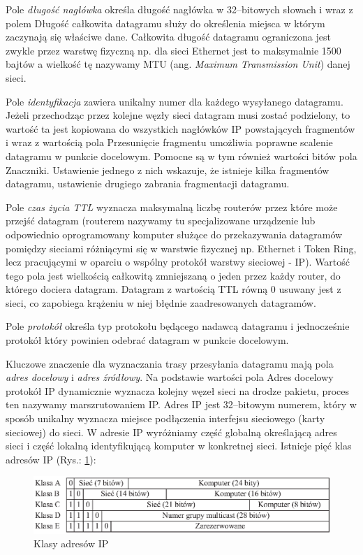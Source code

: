 Pole \emph{długość nagłówka} określa długość nagłówka w 32--bitowych słowach i wraz z polem Długość całkowita datagramu 
służy do określenia miejsca w którym zaczynają się właściwe dane. Całkowita długość datagramu ograniczona jest 
zwykle przez warstwę fizyczną np. dla sieci Ethernet jest to maksymalnie 1500 bajtów a wielkość tę nazywamy MTU 
(ang. \emph{Maximum Transmission Unit}) danej sieci.

Pole \emph{identyfikacja} zawiera unikalny numer dla każdego wysyłanego datagramu. Jeżeli przechodząc przez kolejne 
węzły sieci datagram musi zostać podzielony, to wartość ta jest kopiowana do wszystkich nagłówków IP 
powstających fragmentów i wraz z wartością pola Przesunięcie fragmentu umożliwia poprawne scalenie datagramu w 
punkcie docelowym. Pomocne są w tym również wartości bitów pola Znaczniki. Ustawienie jednego z nich wskazuje, 
że istnieje kilka fragmentów datagramu, ustawienie drugiego zabrania fragmentacji datagramu.

Pole \emph{czas życia TTL} wyznacza  maksymalną liczbę routerów przez które może przejść datagram (routerem 
nazywamy tu specjalizowane urządzenie lub odpowiednio oprogramowany komputer służące do przekazywania datagramów 
pomiędzy sieciami różniącymi się w warstwie fizycznej np. Ethernet i Token Ring, lecz pracującymi w oparciu o 
wspólny protokół warstwy sieciowej - IP). Wartość tego pola jest wielkością całkowitą zmniejszaną o jeden przez 
każdy router, do którego dociera datagram. Datagram z wartością TTL równą 0 usuwany jest z sieci, co zapobiega 
krążeniu w niej błędnie zaadresowanych datagramów.

Pole \emph{protokół} określa typ protokołu będącego nadawcą datagramu i jednocześnie protokół który powinien 
odebrać datagram w punkcie docelowym.

Kluczowe znaczenie dla wyznaczania trasy przesyłania datagramu mają pola \emph{adres docelowy} i \emph{adres źródłowy}. Na 
podstawie wartości pola Adres docelowy protokół IP dynamicznie wyznacza kolejny węzeł sieci na drodze pakietu, 
proces ten nazywamy marszrutowaniem IP. Adres IP jest 32--bitowym numerem, który w sposób unikalny wyznacza 
miejsce podłączenia interfejsu sieciowego (karty sieciowej) do sieci. W adresie IP wyróżniamy część globalną 
określającą adres sieci i część lokalną identyfikującą komputer w konkretnej sieci. Istnieje pięć klas adresów IP (Rys.: \ref{klasy_ip}):
\begin{figure}[h]
\centering
\includegraphics[width=5in]{./rysunki/klasy_adresow.eps}
\caption{Klasy adresów IP}
\label{klasy_ip}
\end{figure}

